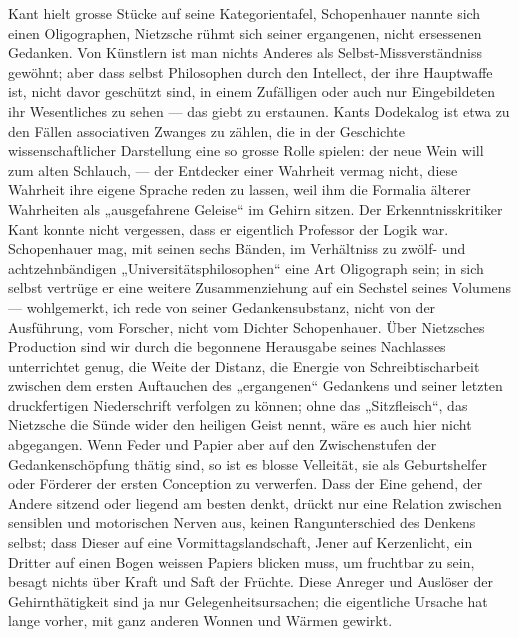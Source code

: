 Kant hielt grosse Stücke auf seine Kategorientafel, Schopenhauer nannte sich einen Oligographen, Nietzsche rühmt sich seiner ergangenen, nicht ersessenen Gedanken. Von Künstlern ist man nichts Anderes als Selbst-Missverständniss gewöhnt; aber dass selbst Philosophen durch den Intellect, der ihre Hauptwaffe ist, nicht davor geschützt sind, in einem Zufälligen oder auch nur Eingebildeten ihr Wesentliches zu sehen — das giebt zu erstaunen. Kants Dodekalog ist etwa zu den Fällen associativen Zwanges zu zählen, die in der Geschichte wissenschaftlicher Darstellung eine so grosse Rolle spielen: der neue Wein will zum alten Schlauch, — der Entdecker einer Wahrheit vermag nicht, diese Wahrheit ihre eigene Sprache reden zu lassen, weil ihm die Formalia älterer Wahrheiten als „ausgefahrene Geleise“ im Gehirn sitzen. Der Erkenntnisskritiker Kant konnte nicht vergessen, dass er eigentlich Professor der Logik war. Schopenhauer mag, mit seinen sechs Bänden, im Verhältniss zu zwölf- und achtzehnbändigen „Universitätsphilosophen“ eine Art Oligograph sein; in sich selbst vertrüge er eine weitere Zusammenziehung auf ein Sechstel seines Volumens — wohlgemerkt, ich rede von seiner Gedankensubstanz, nicht von der Ausführung, vom Forscher, nicht vom Dichter Schopenhauer. Über Nietzsches Production sind wir durch die begonnene Herausgabe seines Nachlasses unterrichtet genug, die Weite der Distanz, die Energie von Schreibtischarbeit zwischen dem ersten Auftauchen des „ergangenen“ Gedankens und seiner letzten druckfertigen Niederschrift verfolgen zu können; ohne das „Sitzfleisch“, das Nietzsche die Sünde wider den heiligen Geist nennt, wäre es auch hier nicht abgegangen. Wenn Feder und Papier aber auf den Zwischenstufen der Gedankenschöpfung thätig sind, so ist es blosse Velleität, sie als Geburtshelfer oder Förderer der ersten Conception zu verwerfen. Dass der Eine gehend, der Andere sitzend oder liegend am besten denkt, drückt nur eine Relation zwischen sensiblen und motorischen Nerven aus, keinen Rangunterschied des Denkens selbst; dass Dieser auf eine Vormittagslandschaft, Jener auf Kerzenlicht, ein Dritter auf einen Bogen weissen Papiers blicken muss, um fruchtbar zu sein, besagt nichts über Kraft und Saft der Früchte. Diese Anreger und Auslöser der Gehirnthätigkeit sind ja nur Gelegenheitsursachen; die eigentliche Ursache hat lange vorher, mit ganz anderen Wonnen und Wärmen gewirkt.
\par

